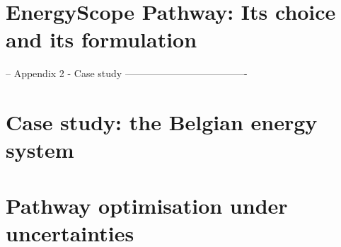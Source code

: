 \documentclass[a4paper,twoside,10pt,final]{memoir} %
\begin{document}








\begin{appendices}

\chapter{EnergyScope Pathway: Its choice and its formulation}
\label{app:EnergyScope}


 -- Appendix 2 - Case study -------------------------------------
\chapter{Case study: the Belgian energy system}
\label{app:case_study}


\chapter{Pathway optimisation under uncertainties}
\label{app:results_UQ}




\end{appendices}
\end{document}
